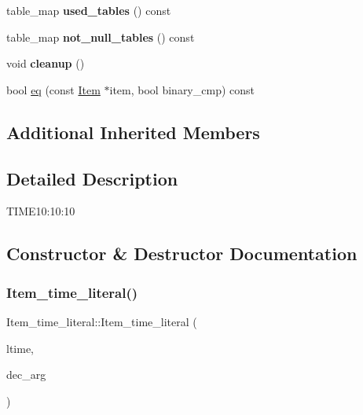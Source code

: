 \begin{DoxyCompactItemize}
\item 
\mbox{\label{classItem__time__literal_ae11b320ef743b622dbe60b20ea34db39}} 
table\+\_\+map {\bfseries used\+\_\+tables} () const
\item 
\mbox{\label{classItem__time__literal_aca5ff82170875e281c17a131aef0eb64}} 
table\+\_\+map {\bfseries not\+\_\+null\+\_\+tables} () const
\item 
\mbox{\label{classItem__time__literal_a52e548b4337f57c92cef6df21672e60a}} 
void {\bfseries cleanup} ()
\item 
bool \mbox{\hyperlink{classItem__time__literal_affc6ba040990919f39ee32d01bbf35c3}{eq}} (const \mbox{\hyperlink{classItem}{Item}} $\ast$item, bool binary\+\_\+cmp) const
\end{DoxyCompactItemize}
\subsection*{Additional Inherited Members}


\subsection{Detailed Description}
T\+I\+ME\textquotesingle{}10\+:10\+:10\textquotesingle{} 

\subsection{Constructor \& Destructor Documentation}
\mbox{\label{classItem__time__literal_a81956a462df92831b4526d2af2f80fb1}} 
\subsubsection{\texorpdfstring{Item\+\_\+time\+\_\+literal()}{Item\_time\_literal()}}
{\footnotesize\ttfamily Item\+\_\+time\+\_\+literal\+::\+Item\+\_\+time\+\_\+literal (\begin{DoxyParamCaption}\item[{M\+Y\+S\+Q\+L\+\_\+\+T\+I\+ME $\ast$}]{ltime,  }\item[{uint}]{dec\+\_\+arg }\end{DoxyParamCaption})\hspace{0.3cm}{\ttfamily [inline]}}

